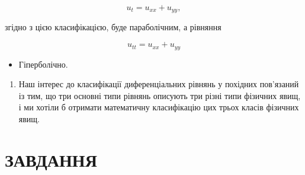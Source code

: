 \documentclass[
]{article}
\providecommand{\tightlist}{%
  \setlength{\itemsep}{0pt}\setlength{\parskip}{0pt}}
\begin{document}
\[
u_t = u_{xx} + u_{yy},
\]

згідно з цією класифікацією, буде параболічним, а рівняння

\[
u_{tt} = u_{xx} + u_{yy}
\]

\begin{itemize}
\tightlist
\item
  Гіперболічно.
\end{itemize}

\begin{enumerate}
\def\labelenumi{\arabic{enumi}.}
\setcounter{enumi}{1}
\tightlist
\item
  Наш інтерес до класифікації диференціальних рівнянь у похідних
  пов'язаний із тим, що три основні типи рівнянь описують три різні типи
  фізичних явищ, і ми хотіли б отримати математичну класифікацію цих
  трьох класів фізичних явищ.
\end{enumerate}

\section{ЗАВДАННЯ}\label{ux437ux430ux432ux434ux430ux43dux43dux44f-3}
\end{document}
